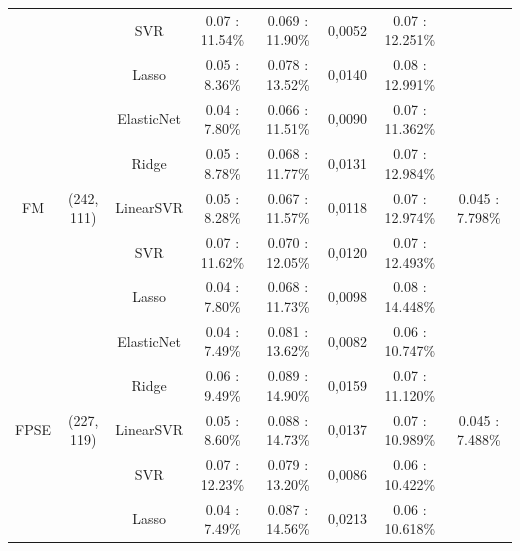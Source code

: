 \begin{table}
{{\begin{tabular}{|c|c|c|c|c|c|c|c|}
				&              &         SVR &  0.07 : 11.54\% &  0.069  : 11.90\% &       0,0052 &  0.07 : 12.251\% &                  \\ \cline{3-8}
				&              &       Lasso &   0.05 : 8.36\% &  0.078  : 13.52\% &       0,0140 &  0.08 : 12.991\% &                  \\ \cline{1-8}
				&              &  ElasticNet &   0.04 : 7.80\% &  0.066  : 11.51\% &       0,0090 &  0.07 : 11.362\% &                  \\ \cline{3-8}
				&              &       Ridge &   0.05 : 8.78\% &  0.068  : 11.77\% &       0,0131 &  0.07 : 12.984\% &                  \\ \cline{3-8}
				FM &   (242, 111) &   LinearSVR &   0.05 : 8.28\% &  0.067  : 11.57\% &       0,0118 &  0.07 : 12.974\% &   0.045 : 7.798\% \\ \cline{3-8}
				&              &         SVR &  0.07 : 11.62\% &  0.070  : 12.05\% &       0,0120 &  0.07 : 12.493\% &                  \\ \cline{3-8}
				&              &       Lasso &   0.04 : 7.80\% &  0.068  : 11.73\% &       0,0098 &  0.08 : 14.448\% &                  \\ \cline{1-8}
				&              &  ElasticNet &   0.04 : 7.49\% &  0.081  : 13.62\% &       0,0082 &  0.06 : 10.747\% &                  \\ \cline{3-8}
				&              &       Ridge &   0.06 : 9.49\% &  0.089  : 14.90\% &       0,0159 &  0.07 : 11.120\% &                  \\ \cline{3-8}
				FPSE &   (227, 119) &   LinearSVR &   0.05 : 8.60\% &  0.088  : 14.73\% &       0,0137 &  0.07 : 10.989\% &   0.045 : 7.488\% \\ \cline{3-8}
				&              &         SVR &  0.07 : 12.23\% &  0.079  : 13.20\% &       0,0086 &  0.06 : 10.422\% &                  \\ \cline{3-8}
				&              &       Lasso &   0.04 : 7.49\% &  0.087  : 14.56\% &       0,0213 &  0.06 : 10.618\% &                  \\ \cline{1-8}
	\end{tabular}}}
	\endgroup
\end{table}
\newpage

